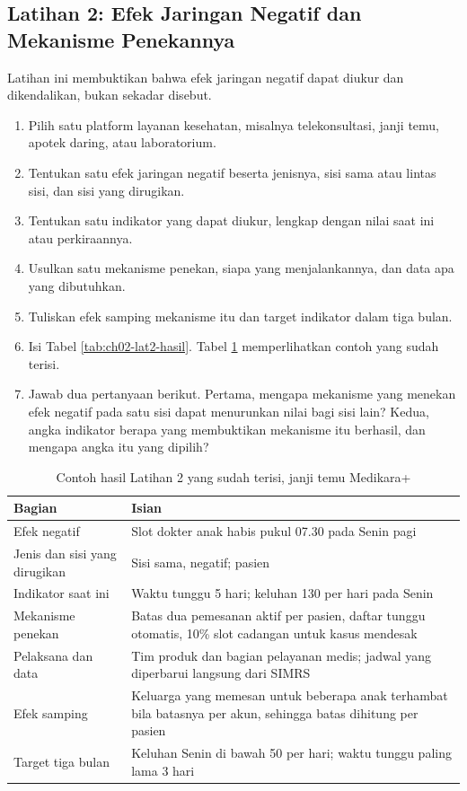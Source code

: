 \subsection*{Latihan 2: Efek Jaringan Negatif dan Mekanisme Penekannya}

Latihan ini membuktikan bahwa efek jaringan negatif dapat diukur dan
dikendalikan, bukan sekadar disebut.

\begin{enumerate}
  \item Pilih satu platform layanan kesehatan, misalnya telekonsultasi, janji
        temu, apotek daring, atau laboratorium.
  \item Tentukan satu efek jaringan negatif beserta jenisnya, sisi sama atau
        lintas sisi, dan sisi yang dirugikan.
  \item Tentukan satu indikator yang dapat diukur, lengkap dengan nilai saat
        ini atau perkiraannya.
  \item Usulkan satu mekanisme penekan, siapa yang menjalankannya, dan data
        apa yang dibutuhkan.
  \item Tuliskan efek samping mekanisme itu dan target indikator dalam tiga
        bulan.
  \item Isi Tabel \ref{tab:ch02-lat2-hasil}. Tabel \ref{tab:ch02-lat2-contoh}
        memperlihatkan contoh yang sudah terisi.
  \item Jawab dua pertanyaan berikut. Pertama, mengapa mekanisme yang menekan
        efek negatif pada satu sisi dapat menurunkan nilai bagi sisi lain?
        Kedua, angka indikator berapa yang membuktikan mekanisme itu berhasil,
        dan mengapa angka itu yang dipilih?
\end{enumerate}

\begin{table}[!htb]
  \centering
  \caption{Contoh hasil Latihan 2 yang sudah terisi, janji temu Medikara+}
  \label{tab:ch02-lat2-contoh}
  \small
  \begin{tabularx}{\textwidth}{lX}
    \hline
    \textbf{Bagian} & \textbf{Isian} \\
    \hline
    Efek negatif & Slot dokter anak habis pukul 07.30 pada Senin pagi \\
    \hline
    Jenis dan sisi yang dirugikan & Sisi sama, negatif; pasien \\
    \hline
    Indikator saat ini & Waktu tunggu 5 hari; keluhan 130 per hari pada Senin \\
    \hline
    Mekanisme penekan & Batas dua pemesanan aktif per pasien, daftar tunggu otomatis, 10\% slot cadangan untuk kasus mendesak \\
    \hline
    Pelaksana dan data & Tim produk dan bagian pelayanan medis; jadwal yang diperbarui langsung dari SIMRS \\
    \hline
    Efek samping & Keluarga yang memesan untuk beberapa anak terhambat bila batasnya per akun, sehingga batas dihitung per pasien \\
    \hline
    Target tiga bulan & Keluhan Senin di bawah 50 per hari; waktu tunggu paling lama 3 hari \\
    \hline
  \end{tabularx}
\end{table}

